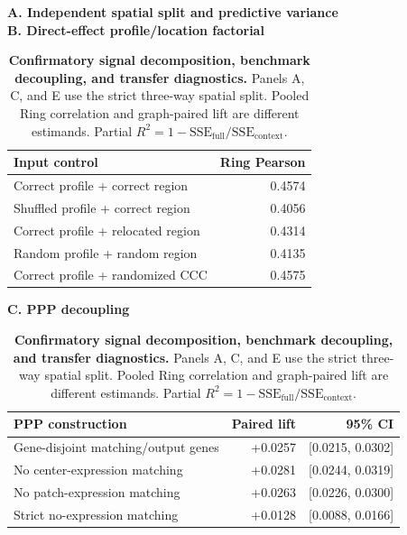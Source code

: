 \begin{table}[t]
\centering
\scriptsize
\caption{\textbf{Confirmatory signal decomposition, benchmark decoupling, and transfer diagnostics.} Panels A, C, and E use the strict three-way spatial split. Pooled Ring correlation and graph-paired lift are different estimands. Partial $R^2=1-\mathrm{SSE}_{\mathrm{full}}/\mathrm{SSE}_{\mathrm{context}}$.}
\label{tab:confirmatory_analysis}
\setlength{\tabcolsep}{3.0pt}
\begin{minipage}[t]{0.49\textwidth}
\centering
\textbf{A. Independent spatial split and predictive variance}\\[-0.2em]
\medskip
\textbf{B. Direct-effect profile/location factorial}\\[-0.2em]
\begin{tabular}{lr}
\toprule
Input control & Ring Pearson \\
\midrule
Correct profile + correct region & 0.4574 \\
Shuffled profile + correct region & 0.4056 \\
Correct profile + relocated region & 0.4314 \\
Random profile + random region & 0.4135 \\
Correct profile + randomized CCC & 0.4575 \\
\bottomrule
\end{tabular}
\medskip
\textbf{C. PPP decoupling}\\[-0.2em]
\begin{tabular}{lrr}
\toprule
PPP construction & Paired lift & 95\% CI \\
\midrule
Gene-disjoint matching/output genes & +0.0257 & [0.0215, 0.0302] \\
No center-expression matching & +0.0281 & [0.0244, 0.0319] \\
No patch-expression matching & +0.0263 & [0.0226, 0.0300] \\
Strict no-expression matching & +0.0128 & [0.0088, 0.0166] \\

\end{tabular}
\end{minipage}
\end{table}

